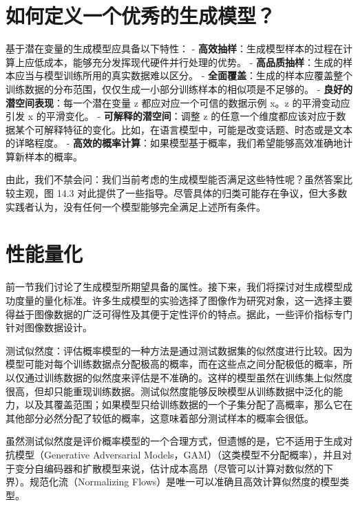 \documentclass[lang=cn,newtx,10pt,scheme=chinese]{elegantbook}
\begin{document}
\section{如何定义一个优秀的生成模型？}
基于潜在变量的生成模型应具备以下特性：
- \textbf{高效抽样}：生成模型样本的过程在计算上应低成本，能够充分发挥现代硬件并行处理的优势。
- \textbf{高品质抽样}：生成的样本应当与模型训练所用的真实数据难以区分。
- \textbf{全面覆盖}：生成的样本应覆盖整个训练数据的分布范围，仅仅生成一小部分训练样本的相似项是不足够的。
- \textbf{良好的潜空间表现}：每一个潜在变量 z 都应对应一个可信的数据示例 x。z 的平滑变动应引发 x 的平滑变化。
- \textbf{可解释的潜空间}：调整 z 的任意一个维度都应该对应于数据某个可解释特征的变化。比如，在语言模型中，可能是改变话题、时态或是文本的详略程度。
- \textbf{高效的概率计算}：如果模型基于概率，我们希望能够高效准确地计算新样本的概率。

由此，我们不禁会问：我们当前考虑的生成模型能否满足这些特性呢？虽然答案比较主观，图 14.3 对此提供了一些指导。尽管具体的归类可能存在争议，但大多数实践者认为，没有任何一个模型能够完全满足上述所有条件。


\section{性能量化}
前一节我们讨论了生成模型所期望具备的属性。接下来，我们将探讨对生成模型成功度量的量化标准。许多生成模型的实验选择了图像作为研究对象，这一选择主要得益于图像数据的广泛可得性及其便于定性评价的特点。据此，一些评价指标专门针对图像数据设计。

测试似然度：评估概率模型的一种方法是通过测试数据集的似然度进行比较。因为模型可能对每个训练数据点分配极高的概率，而在这些点之间分配极低的概率，所以仅通过训练数据的似然度来评估是不准确的。这样的模型虽然在训练集上似然度很高，但却只能重现训练数据。测试似然度能够反映模型从训练数据中泛化的能力，以及其覆盖范围；如果模型只给训练数据的一个子集分配了高概率，那么它在其他部分必然分配了较低的概率，这意味着部分测试样本的概率会很低。

虽然测试似然度是评价概率模型的一个合理方式，但遗憾的是，它不适用于生成对抗模型（Generative Adversarial Models，GAM）（这类模型不分配概率），并且对于变分自编码器和扩散模型来说，估计成本高昂（尽管可以计算对数似然的下界）。规范化流（Normalizing Flows）是唯一可以准确且高效计算似然度的模型类型。
\end{document}
